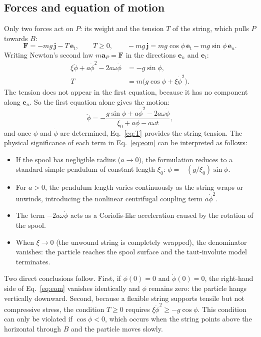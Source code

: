 \documentclass[11pt,a4paper]{article}
\newcommand{\dt}[1]{\dot{#1}}
\newcommand{\ddt}[1]{\ddot{#1}}
\newcommand{\en}{\bm{e}_n}
\newcommand{\et}{\bm{e}_t}
\begin{document}
\subsection{Forces and equation of motion}
Only two forces act on $P$: its weight and the tension $T$ of the string, which pulls $P$ towards $B$:
\begin{equation}
\bm F=-mg\,\bm j-T\,\et,\qquad T\geq0,\qquad -mg\,\bm j=mg\cos\phi\,\et-mg\sin\phi\,\en .
\label{eq:forces}
\end{equation}
Writing Newton's second law $m\bm a_P=\bm F$ in the directions $\en$ and $\et$:
\begin{align}
\xi\ddot{\phi}+a\dt{\phi}^{2}-2a\omega\dt{\phi}&=-g\sin\phi ,\label{eq:eomn}\\
T&=m\big(g\cos\phi+\xi\dt{\phi}^{2}\big).\label{eq:T}
\end{align}
The tension does not appear in the first equation, because it has no component along $\en$. So the first equation alone gives the motion:
\begin{equation}
\ddot{\phi}=-\frac{g\sin\phi+a\dt{\phi}^{2}-2a\omega\dt{\phi}}{\xi_0+a\phi-a\omega t},
\label{eq:eom}
\end{equation}
and once $\phi$ and $\dt\phi$ are determined, Eq.~\eqref{eq:T} provides the string tension. The physical significance of each term in Eq.~\eqref{eq:eom} can be interpreted as follows:
\begin{itemize}[noitemsep,topsep=2pt]
\item If the spool has negligible radius ($a\to0$), the formulation reduces to a standard simple pendulum of constant length $\xi_0$: $\ddt\phi=-(g/\xi_0)\sin\phi$.
\item For $a>0$, the pendulum length varies continuously as the string wraps or unwinds, introducing the nonlinear centrifugal coupling term $a\dt\phi^2$.
\item The term $-2a\omega\dt\phi$ acts as a Coriolis-like acceleration caused by the rotation of the spool.
\item When $\xi\to0$ (the unwound string is completely wrapped), the denominator vanishes: the particle reaches the spool surface and the taut-involute model terminates.
\end{itemize}
Two direct conclusions follow. First, if $\phi(0)=0$ and $\dt\phi(0)=0$, the right-hand side of Eq.~\eqref{eq:eom} vanishes identically and $\phi$ remains zero: the particle hangs vertically downward. Second, because a flexible string supports tensile but not compressive stress, the condition $T\ge0$ requires $\xi\dt\phi^2\ge-g\cos\phi$. This condition can only be violated if $\cos\phi<0$, which occurs when the string points above the horizontal through $B$ and the particle moves slowly.
\end{document}
